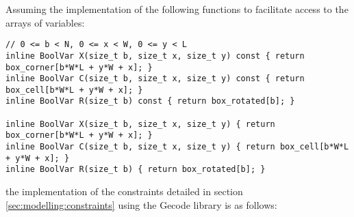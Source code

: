 Assuming the implementation of the following functions to facilitate
access to the arrays of variables:

{\NOINDENT \begin{lstlisting}
// 0 <= b < N, 0 <= x < W, 0 <= y < L
inline BoolVar X(size_t b, size_t x, size_t y) const { return box_corner[b*W*L + y*W + x]; }
inline BoolVar C(size_t b, size_t x, size_t y) const { return box_cell[b*W*L + y*W + x]; }
inline BoolVar R(size_t b) const { return box_rotated[b]; }

inline BoolVar X(size_t b, size_t x, size_t y) { return box_corner[b*W*L + y*W + x]; }
inline BoolVar C(size_t b, size_t x, size_t y) { return box_cell[b*W*L + y*W + x]; }
inline BoolVar R(size_t b) { return box_rotated[b]; }
\end{lstlisting}}

the implementation of the constraints detailed in section \ref{sec:modelling:constraints}
using the Gecode library is as follows:

